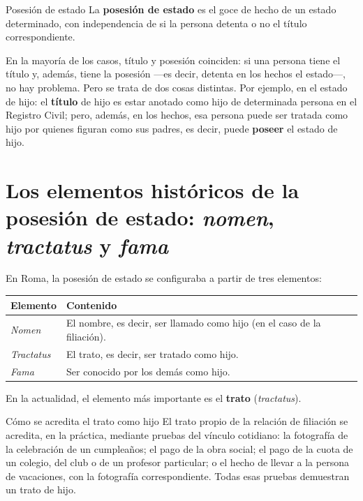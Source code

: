 \documentclass[12pt,oneside]{book}
\begin{document}
\begin{definition}{Posesión de estado}
La \textbf{posesión de estado} es el goce de hecho de un estado determinado, con independencia de si la persona detenta o no el título correspondiente.
\end{definition}

\begin{important}
En la mayoría de los casos, título y posesión coinciden: si una persona tiene el título y, además, tiene la posesión —es decir, detenta en los hechos el estado—, no hay problema. Pero se trata de dos cosas distintas. Por ejemplo, en el estado de hijo: el \textbf{título} de hijo es estar anotado como hijo de determinada persona en el Registro Civil; pero, además, en los hechos, esa persona puede ser tratada como hijo por quienes figuran como sus padres, es decir, puede \textbf{poseer} el estado de hijo.
\end{important}

\section{Los elementos históricos de la posesión de estado: \textit{nomen}, \textit{tractatus} y \textit{fama}}

En Roma, la posesión de estado se configuraba a partir de tres elementos:

\begin{table}[H]
\centering
\begin{tabularx}{\textwidth}{l X}
\toprule
\textbf{Elemento} & \textbf{Contenido} \\
\midrule
\textit{Nomen} & El nombre, es decir, ser llamado como hijo (en el caso de la filiación). \\
\textit{Tractatus} & El trato, es decir, ser tratado como hijo. \\
\textit{Fama} & Ser conocido por los demás como hijo. \\
\bottomrule
\end{tabularx}
\end{table}

En la actualidad, el elemento más importante es el \textbf{trato} (\textit{tractatus}).

\begin{example}{Cómo se acredita el trato como hijo}
El trato propio de la relación de filiación se acredita, en la práctica, mediante pruebas del vínculo cotidiano: la fotografía de la celebración de un cumpleaños; el pago de la obra social; el pago de la cuota de un colegio, del club o de un profesor particular; o el hecho de llevar a la persona de vacaciones, con la fotografía correspondiente. Todas esas pruebas demuestran un trato de hijo.
\end{example}
\end{document}
